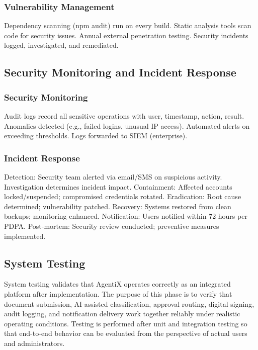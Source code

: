 \documentclass[12pt,oneside,openright,a4paper]{cpe-english-project}
\begin{document}
\subsubsection{Vulnerability Management}

Dependency scanning (npm audit) run on every build. Static analysis tools scan code for security issues. Annual external penetration testing. Security incidents logged, investigated, and remediated.

\vspace{1em}

\subsection{Security Monitoring and Incident Response}

\subsubsection{Security Monitoring}

Audit logs record all sensitive operations with user, timestamp, action, result. Anomalies detected (e.g., failed logins, unusual IP access). Automated alerts on exceeding thresholds. Logs forwarded to SIEM (enterprise).

\subsubsection{Incident Response}

Detection: Security team alerted via email/SMS on suspicious activity. Investigation determines incident impact. Containment: Affected accounts locked/suspended; compromised credentials rotated. Eradication: Root cause determined; vulnerability patched. Recovery: Systems restored from clean backups; monitoring enhanced. Notification: Users notified within 72 hours per PDPA. Post-mortem: Security review conducted; preventive measures implemented.

\subsection{System Testing}

System testing validates that AgentiX operates correctly as an integrated platform after implementation. The purpose of this phase is to verify that document submission, AI-assisted classification, approval routing, digital signing, audit logging, and notification delivery work together reliably under realistic operating conditions. Testing is performed after unit and integration testing so that end-to-end behavior can be evaluated from the perspective of actual users and administrators.
\end{document}
